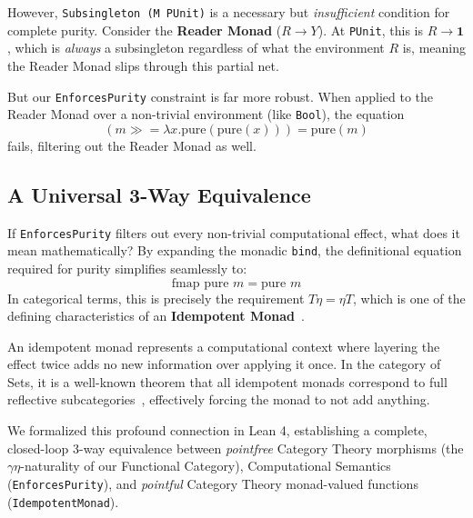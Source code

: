 \documentclass{article}
\begin{document}
However, \texttt{Subsingleton (M PUnit)} is a necessary but \emph{insufficient} condition for
complete purity. Consider the \textbf{Reader Monad} ($R \to Y$). At \texttt{PUnit}, this is 
$R \to \mathbf{1}$, which is \emph{always} a subsingleton regardless of what the environment $R$ is,
meaning the Reader Monad slips through this partial net. 

But our \texttt{EnforcesPurity} constraint is far more robust. When applied to the Reader Monad over
a non-trivial environment (like \texttt{Bool}), the equation 
\[
(m \gg= \lambda x. \text{pure}(\text{pure}(x))) = \text{pure}(m)
\]
fails, filtering out the Reader Monad as well. 

\subsection{A Universal 3-Way Equivalence}
If \texttt{EnforcesPurity} filters out every non-trivial computational effect, what does it mean
mathematically? By expanding the monadic \texttt{bind}, the definitional equation required for
purity simplifies seamlessly to:
\[
\text{fmap pure } m = \text{pure } m
\]
In categorical terms, this is precisely the requirement $T\eta = \eta T$, which is one of the
defining characteristics of an \textbf{Idempotent Monad}~\cite{nlab-idempotent-monad, borceux1994}. 

An idempotent monad represents a computational context where layering the effect twice adds no new
information over applying it once. In the category of Sets, it is a well-known theorem that all
idempotent monads correspond to full reflective subcategories~\cite{nlab-reflective-subcategory, borceux1994}, effectively forcing the monad to not
add anything.

We formalized this profound connection in Lean 4, establishing a complete, closed-loop 3-way
equivalence between \emph{pointfree} Category Theory morphisms
(the $\gamma\eta$-naturality of our Functional Category), Computational Semantics
(\texttt{EnforcesPurity}), and \emph{pointful} Category Theory monad-valued functions
(\texttt{IdempotentMonad}). 

\begin{center}
\end{center}
\end{document}
